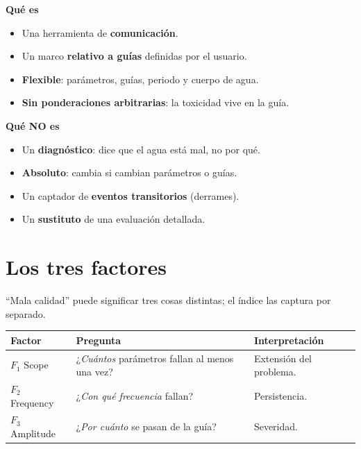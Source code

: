 \documentclass[11pt,a4paper]{article}
\begin{document}
\begin{minipage}[t]{0.48\textwidth}
\textbf{Qué es}
\begin{itemize}[leftmargin=1.1em,nosep]
  \item Una herramienta de \textbf{comunicación}.
  \item Un marco \textbf{relativo a guías} definidas por el usuario.
  \item \textbf{Flexible}: parámetros, guías, periodo y cuerpo de agua.
  \item \textbf{Sin ponderaciones arbitrarias}: la toxicidad vive en la guía.
\end{itemize}
\end{minipage}\hfill
\begin{minipage}[t]{0.48\textwidth}
\textbf{Qué NO es}
\begin{itemize}[leftmargin=1.1em,nosep]
  \item Un \textbf{diagnóstico}: dice que el agua está mal, no por qué.
  \item \textbf{Absoluto}: cambia si cambian parámetros o guías.
  \item Un captador de \textbf{eventos transitorios} (derrames).
  \item Un \textbf{sustituto} de una evaluación detallada.
\end{itemize}
\end{minipage}

\section{Los tres factores}
``Mala calidad'' puede significar tres cosas distintas; el índice las captura por separado.

\begin{center}\renewcommand{\arraystretch}{1.3}
\begin{tabular}{@{}p{2.3cm} p{4.1cm} p{7.6cm}@{}}
\toprule
\textbf{Factor} & \textbf{Pregunta} & \textbf{Interpretación} \\ \midrule
$F_1$ \small Scope & ¿\emph{Cuántos} parámetros fallan al menos una vez? & Extensión del problema. \\
$F_2$ \small Frequency & ¿\emph{Con qué frecuencia} fallan? & Persistencia. \\
$F_3$ \small Amplitude & ¿\emph{Por cuánto} se pasan de la guía? & Severidad. \\ \bottomrule
\end{tabular}
\end{center}
\end{document}
